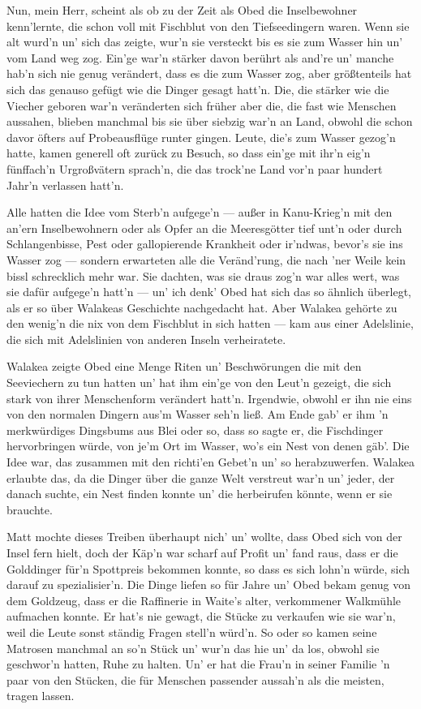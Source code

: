 Nun, mein Herr, scheint als ob zu der Zeit als Obed die Inselbewohner kenn'lernte, die schon voll mit Fischblut von den Tiefseedingern waren. Wenn sie alt wurd'n un' sich das zeigte, wur'n sie versteckt bis es sie zum Wasser hin un' vom Land weg zog. Ein'ge war'n stärker davon berührt als and're un' manche hab'n sich nie genug verändert, dass es die zum Wasser zog, aber größtenteils hat sich das genauso gefügt wie die Dinger gesagt hatt'n. Die, die stärker wie die Viecher geboren war'n veränderten sich früher aber die, die fast wie Menschen aussahen, blieben manchmal bis sie über siebzig war'n an Land, obwohl die schon davor öfters auf Probeausflüge runter gingen. Leute, die's zum Wasser gezog'n hatte, kamen generell oft zurück zu Besuch, so dass ein'ge mit ihr'n eig'n fünffach'n Urgroßvätern sprach'n, die das trock'ne Land vor'n paar hundert Jahr'n verlassen hatt'n.

Alle hatten die Idee vom Sterb'n aufgege'n --- außer in Kanu-Krieg'n mit den an'ern Inselbewohnern oder als Opfer an die Meeresgötter tief unt'n oder durch Schlangenbisse, Pest oder gallopierende Krankheit oder ir'ndwas, bevor's sie ins Wasser zog --- sondern erwarteten alle die Veränd'rung, die nach 'ner Weile kein bissl schrecklich mehr war. Sie dachten, was sie draus zog'n war alles wert, was sie dafür aufgege'n hatt'n --- un' ich denk' Obed hat sich das so ähnlich überlegt, als er so über Walakeas Geschichte nachgedacht hat. Aber Walakea gehörte zu den wenig'n die nix von dem Fischblut in sich hatten --- kam aus einer Adelslinie, die sich mit Adelslinien von anderen Inseln verheiratete.

Walakea zeigte Obed eine Menge Riten un' Beschwörungen die mit den Seeviechern zu tun hatten un' hat ihm ein'ge von den Leut'n gezeigt, die sich stark von ihrer Menschenform verändert hatt'n. Irgendwie, obwohl er ihn nie eins von den normalen Dingern aus'm Wasser seh'n ließ. Am Ende gab' er ihm 'n merkwürdiges Dingsbums aus Blei oder so, dass so sagte er, die Fischdinger hervorbringen würde, von je'm Ort im Wasser, wo's ein Nest von denen gäb'. Die Idee war, das zusammen mit den richti'en Gebet'n un' so herabzuwerfen. Walakea erlaubte das, da die Dinger über die ganze Welt verstreut war'n un' jeder, der danach suchte, ein Nest finden konnte un' die herbeirufen könnte, wenn er sie brauchte.

Matt mochte dieses Treiben überhaupt nich' un' wollte, dass Obed sich von der Insel fern hielt, doch der Käp'n war scharf auf Profit un' fand raus, dass er die Golddinger für'n Spottpreis bekommen konnte, so dass es sich lohn'n würde, sich darauf zu spezialisier'n. Die Dinge liefen so für Jahre un' Obed bekam genug von dem Goldzeug, dass er die Raffinerie in Waite's alter, verkommener Walkmühle aufmachen konnte. Er hat's nie gewagt, die Stücke zu verkaufen wie sie war'n, weil die Leute sonst ständig Fragen stell'n würd'n. So oder so kamen seine Matrosen manchmal an so'n Stück un' wur'n das hie un' da los, obwohl sie geschwor'n hatten, Ruhe zu halten. Un' er hat die Frau'n in seiner Familie 'n paar von den Stücken, die für  Menschen passender aussah'n als die meisten, tragen lassen.


